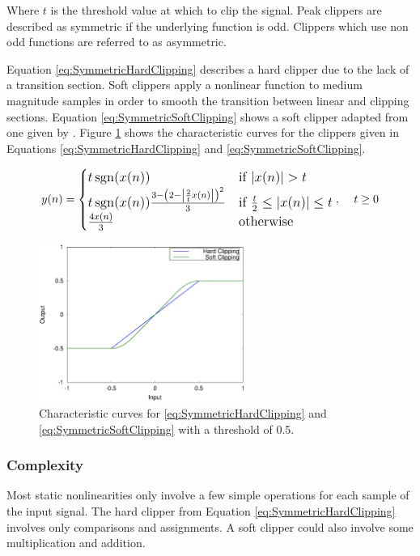 		Where $t$ is the threshold value at which to clip the signal. Peak clippers are described as symmetric if
		the underlying function is odd. Clippers which use non odd functions are referred to as asymmetric.

		Equation \ref{eq:SymmetricHardClipping} describes a hard clipper due to the lack of a transition section.
		Soft clippers apply a nonlinear function to medium magnitude samples in order to smooth the transition
		between linear and clipping sections. Equation \ref{eq:SymmetricSoftClipping} shows a soft clipper adapted
		from one given by \citet{dutilleux2002nonlinear}. Figure \ref{fig:Clipping} shows the characteristic curves
		for the clippers given in Equations \ref{eq:SymmetricHardClipping} and \ref{eq:SymmetricSoftClipping}.

		\begin{equation}
			\large
			y(n) = \begin{cases}
				t\operatorname{sgn}(x(n)) & \text{if $|x(n)| > t$} \\
				t\operatorname{sgn}(x(n))\frac{3 - \left(2 - \left|\frac{2}{t}x(n) \right| \right)^{2}}{3} & \text{if
					$\frac{t}{2} \leq |x(n)| \leq t$} \\
				\frac{4x(n)}{3} & \text{otherwise}
			\end{cases}, \quad t \geq 0
			\label{eq:SymmetricSoftClipping}
		\end{equation}

		\begin{figure}[h!]
			\centering
			\includegraphics[width=0.6\textwidth]{chapter3/Images/Clipping.eps}
			\caption{Characteristic curves for \ref{eq:SymmetricHardClipping} and
				 \ref{eq:SymmetricSoftClipping} with a threshold of 0.5.}
			\label{fig:Clipping}
		\end{figure}

		\subsubsection*{Complexity}
			Most static nonlinearities only involve a few simple operations for each sample of the input
			signal. The hard clipper from Equation \ref{eq:SymmetricHardClipping} involves only comparisons and
			assignments. A soft clipper could also involve some multiplication and addition.
			
